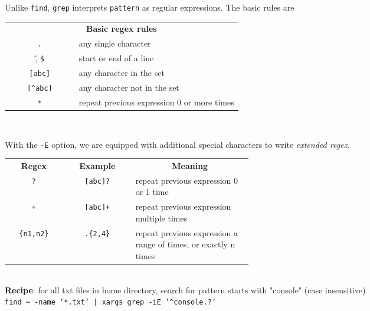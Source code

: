 \documentclass[landscape,a0paper,fontscale=0.285]{baposter} %
\begin{document}
\begin{poster}
{\vspace

Unlike \texttt{\small{find}}, \texttt{\small{grep}} interprets \texttt{\small{pattern}} as regular expressions. The basic rules are \\

\begin{tabular}{cp{0.7\linewidth}}
\multicolumn{2}{c}{\textbf{Basic regex rules}} \\
     \texttt{.} & any single character \\
     \^ ,  \texttt{\$} & start or end of a line \\
     \texttt{[abc]} & any character in the set \\
     \texttt{[\^{}abc]} & any character not in the set \\
     \texttt{*} & repeat previous expression 0 or more times \\

\end{tabular}\\
\vspace

With the \texttt{-E} option, we are equipped with additional special characters to write \textit{extended regex}. \\


\begin{tabular}{ccp{0.48\linewidth}}
\multicolumn{1}{c}{\textbf{Regex}} &
\multicolumn{1}{c}{\textbf{Example}} &
\multicolumn{1}{c}{\textbf{Meaning}} \\
\texttt{?} & \texttt{\small{[abc]?}} & repeat previous expression 0 or 1 time \\
\texttt{+} & \texttt{\small{[abc]+}} & repeat previous expression multiple times \\
\texttt{\small{\{n1,n2\}}} & \texttt{.}\texttt{\{2,4\}} & repeat previous expression a range of times, or exactly n times \\
\end{tabular}\\

\textbf{Recipe}: for all txt files in home directory, search for pattern starts with "console" (case insensitive) \\



\texttt{\small{find \textbf{\textasciitilde} -name '*.txt' | xargs grep -iE '\^{}console.?'}}

}
\end{poster}

\newpage

\end{document}
